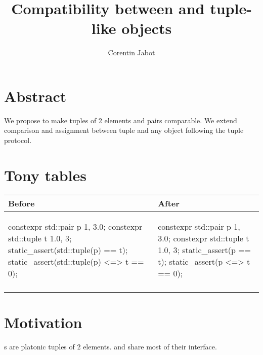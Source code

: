 \documentclass{wg21}
\title{Compatibility between \tcode{tuple} and tuple-like objects}
\author{Corentin Jabot}{corentin.jabot@gmail.com}
\begin{document}
\maketitle


\section{Abstract}

We propose to make tuples of 2 elements and pairs comparable.
We extend comparison and assignment between tuple and any object following the tuple protocol.

\section{Tony tables}
\begin{center}
\begin{tabular}{l|l}
Before & After\\ \hline

\begin{minipage}[t]{0.5\textwidth}
\begin{colorblock}

constexpr std::pair  p {1, 3.0};
constexpr std::tuple t {1.0, 3};
static_assert(std::tuple(p) == t);
static_assert(std::tuple(p) <=> t == 0);

\end{colorblock}
\end{minipage}
&
\begin{minipage}[t]{0.5\textwidth}
\begin{colorblock}

constexpr std::pair  p {1, 3.0};
constexpr std::tuple t {1.0, 3};
static_assert(p == t);
static_assert(p <=> t == 0);

\end{colorblock}
\end{minipage}
\\\\ \hline

\end{tabular}
\end{center}

\section{Motivation}

s are platonic tuples of 2 elements.  and  share
most of their interface.
\end{document}
